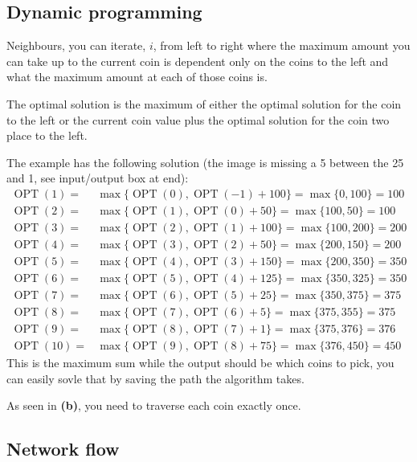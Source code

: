 \documentclass[a4paper]{article}
\newenvironment{task}[1]
{
	\begin{description}[align=right]
		\item [#1]
}{		%
	\end{description}
}
\newcommand{\taskref}[1]{\textbf{#1}}
\DeclareMathOperator{\OPT}{OPT}
\DeclareMathOperator{\*}{\cdot}
\begin{document}
\subsection*{Dynamic programming}

\begin{task}{5. (a)}
	 Neighbours, you can iterate, $i$, from left to right where the maximum amount you can take up to the current coin is dependent only on the coins to the left and what the maximum amount at each of those coins is.
\end{task}

\begin{task}{(b)}
	 The optimal solution is the maximum of either the optimal solution for the coin to the left or the current coin value plus the optimal solution for the coin two place to the left.
	
	The example has the following solution (the image is missing a 5 between the 25 and 1, see input/output box at end):
	\begin{align*}
		\OPT(1)=&\max\{\OPT(0), \OPT(-1)+100\}=\max\{0,100\}=100 \\
		\OPT(2)=&\max\{\OPT(1), \OPT(0)+50\}=\max\{100,50\}=100 \\
		\OPT(3)=&\max\{\OPT(2), \OPT(1)+100\}=\max\{100,200\}=200 \\
		\OPT(4)=&\max\{\OPT(3), \OPT(2)+50\}=\max\{200,150\}=200 \\
		\OPT(5)=&\max\{\OPT(4), \OPT(3)+150\}=\max\{200,350\}=350 \\
		\OPT(6)=&\max\{\OPT(5), \OPT(4)+125\}=\max\{350,325\}=350 \\
		\OPT(7)=&\max\{\OPT(6), \OPT(5)+25\}=\max\{350,375\}=375 \\
		\OPT(8)=&\max\{\OPT(7), \OPT(6)+5\}=\max\{375,355\}=375 \\
		\OPT(9)=&\max\{\OPT(8), \OPT(7)+1\}=\max\{375,376\}=376 \\
		\OPT(10)=&\max\{\OPT(9), \OPT(8)+75\}=\max\{376,450\}=450
	\end{align*} 
	This is the maximum sum while the output should be which coins to pick, you can easily sovle that by saving the path the algorithm takes. 
\end{task}

\begin{task}{(c)}
	 As seen in \taskref{(b)}, you need to traverse each coin exactly once.
\end{task}

\subsection*{Network flow}
\end{document}
